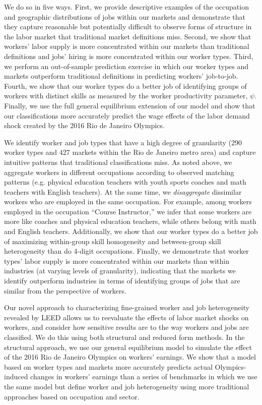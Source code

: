 \documentclass[12pt]{article}
\theoremstyle{definition}
\theoremstyle{plain}
\begin{document}
We do so in five ways. First, we provide descriptive examples of the occupation and geographic distributions of jobs within our markets and demonstrate that they capture reasonable but potentially difficult to observe forms of structure in the labor market that traditional market definitions miss. Second, we show that workers' labor supply is more concentrated  within our markets than traditional definitions and jobs' hiring is more concentrated within our worker types. Third, we perform an out-of-sample prediction exercise in which our worker types and markets outperform traditional definitions in predicting workers' job-to-job. Fourth, we show that our worker types do a better job of identifying groups of workers with distinct skills as measured by the worker productivity parameter, $\psi$. Finally, we use the full general equilibrium extension of our model and show that our classifications more accurately predict the wage effects of the labor demand shock created by the 2016 Rio de Janeiro Olympics. 



We identify worker and job types that have a high degree of granularity (290 worker types and 427 markets within the Rio de Janeiro metro area) and capture intuitive patterns that traditional classifications miss. As noted above, we aggregate workers in different occupations according to observed matching patterns (e.g. physical education teachers with youth sports coaches and math teachers with English teachers). At the same time, we \emph{disaggregate} dissimilar workers who are employed in the same occupation. For example, among workers employed in the occupation ``Course Instructor,'' we infer that some workers are more like coaches and physical education teachers, while others belong with math and English teachers. Additionally, we show that our worker types do a better job of maximizing within-group skill homogeneity and between-group skill heterogeneity than do 4-digit occupations.  Finally, we demonstrate that worker types' labor supply is more concentrated within our markets than within industries (at varying levels of granularity), indicating that the markets we identify outperform industries in terms of identifying groups of jobs that are similar from the perspective of workers.  

Our novel approach to characterizing fine-grained worker and job heterogeneity revealed by LEED allows us to reevaluate the effects of labor market shocks on workers, and consider how sensitive results are to the way workers and jobs are classified. We do this using both structural and reduced form methods. In the structural approach, we use our general equilibrium model to simulate the effect of the 2016 Rio de Janeiro Olympics on workers' earnings. We show that a model based on worker types and markets more accurately predicts actual Olympics-induced changes in workers' earnings than a series of benchmarks in which we use the same model but define worker and job heterogeneity using more traditional approaches based on occupation and sector. 
\end{document}
